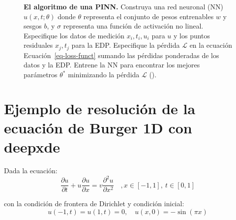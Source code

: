 \documentclass[
  spanish,
  us-letterpaper,
  DIV=11,
  numbers=noendperiod]{scrreprt}
\theoremstyle{definition}
\theoremstyle{plain}
\theoremstyle{remark}
\begin{document}
\begin{figure}


\caption{\label{fig-pinn_graph}\textbf{El algoritmo de una PINN.}
Construya una red neuronal (NN) \(u(x, t; \theta)\) donde \(\theta\)
representa el conjunto de pesos entrenables \(w\) y sesgos \(b\), y
\(\sigma\) representa una función de activación no lineal. Especifique
los datos de medición \({x_i, t_i, u_i}\) para \(u\) y los puntos
residuales \({x_j, t_j}\) para la EDP. Especifique la pérdida
\(\mathcal{L}\) en la ecuación Ecuación~\ref{eq-loss-funct} sumando las
pérdidas ponderadas de los datos y la EDP. Entrene la NN para encontrar
los mejores parámetros \(\mathbb{\theta^*}\) minimizando la pérdida
\(\mathcal{L}\) ().}

\end{figure}%

\section{Ejemplo de resolución de la ecuación de Burger 1D con
deepxde}\label{ejemplo-de-resoluciuxf3n-de-la-ecuaciuxf3n-de-burger-1d-con-deepxde}

Dada la ecuación: \[
\dfrac{\partial u}{\partial t} + u\dfrac{\partial u}{\partial x} = v\dfrac{\partial^2 u}{\partial x^2} \quad, x \in[-1,1], \ t\in[0,1]
\]

con la condición de frontera de Dirichlet y condición inicial: \[
u(-1,t) = u(1,t) = 0, \quad u(x,0)=-\sin(\pi x)
\]
\end{document}

